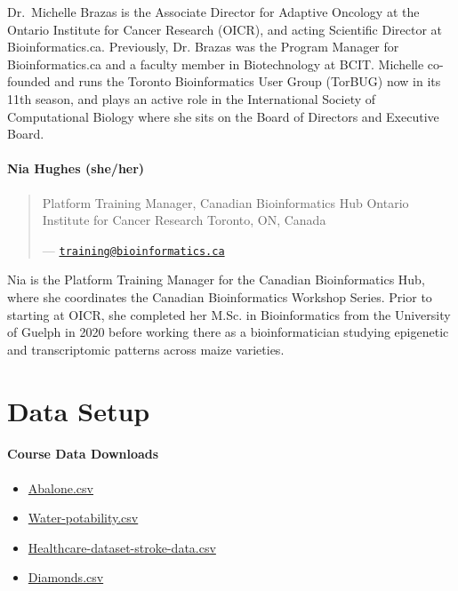 \documentclass[
]{book}
\providecommand{\tightlist}{%
  \setlength{\itemsep}{0pt}\setlength{\parskip}{0pt}}
\begin{document}
Dr.~Michelle Brazas is the Associate Director for Adaptive Oncology at the Ontario Institute for
Cancer Research (OICR), and acting Scientific Director at Bioinformatics.ca. Previously, Dr.
Brazas was the Program Manager for Bioinformatics.ca and a faculty member in
Biotechnology at BCIT. Michelle co-founded and runs the Toronto Bioinformatics User Group
(TorBUG) now in its 11th season, and plays an active role in the International Society of
Computational Biology where she sits on the Board of Directors and Executive Board.

\subsubsection{Nia Hughes (she/her)}\label{nia-hughes-sheher}

\begin{quote}
Platform Training Manager, Canadian Bioinformatics Hub
Ontario Institute for Cancer Research
Toronto, ON, Canada

--- \href{mailto:training@bioinformatics.ca}{\nolinkurl{training@bioinformatics.ca}}
\end{quote}

Nia is the Platform Training Manager for the Canadian Bioinformatics Hub, where she coordinates the Canadian Bioinformatics Workshop Series. Prior to starting at OICR, she completed her M.Sc. in Bioinformatics from the University of Guelph in 2020 before working there as a bioinformatician studying epigenetic and transcriptomic patterns across maize varieties.

\chapter{Data Setup}\label{data-setup}

\subsubsection{Course Data Downloads}\label{course-data-downloads}

\begin{itemize}
\tightlist
\item
  \href{/datasets/abalone.csv}{Abalone.csv}
\item
  \href{/datasets/water_potability.csv}{Water-potability.csv}
\item
  \href{/datasets/healthcare-dataset-stroke-data.csv}{Healthcare-dataset-stroke-data.csv}
\item
  \href{/datasets/diamonds.csv}{Diamonds.csv}
\end{itemize}
\end{document}
